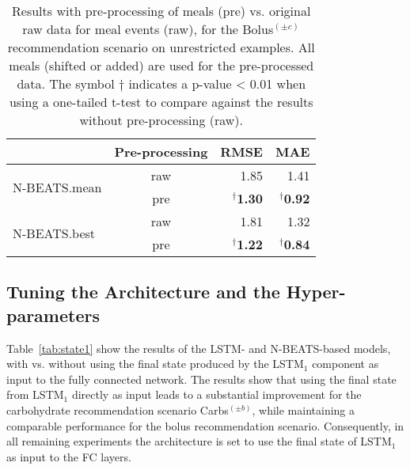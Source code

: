 \begin{table}[ht]
\setlength{\tabcolsep}{4pt}
\caption{Results with pre-processing of meals (pre) vs. original raw data for meal events (raw), for the Bolus$^{(\pm c)}$ recommendation scenario on unrestricted examples. All meals (shifted or added) are used for the pre-processed data. The symbol $\dagger$ indicates a p-value < 0.01 when using a one-tailed t-test to compare against the results without pre-processing (raw).}
\begin{center}
\label{tab:pre-bolus}
\small
\begin{tabular}{|l|c|rr|}
    \cline{2-4}
	\multicolumn{1}{c|}{} & Pre-processing & RMSE & MAE\\
    \hline
    \multirow{2}{*}{N-BEATS.mean} & raw & 1.85 & 1.41\\
    & pre & $^\dagger${\bf 1.30} & $^\dagger${\bf 0.92}\\
    \hline
    \multirow{2}{*}{N-BEATS.best} & raw & 1.81 & 1.32 \\
    & pre & $^\dagger${\bf 1.22} & $^\dagger${\bf 0.84}\\
    \hline
\end{tabular}
\end{center}
\end{table}

\subsection{Tuning the Architecture and the Hyper-parameters}
\label{sec:development}

Table~\ref{tab:state1} show the results of the \ac{LSTM}- and \ac{N-BEATS}-based models, with vs. without using the final state produced by the LSTM$_1$ component as input to the fully connected network. The results show that using the final state from LSTM$_1$ directly as input leads to a substantial improvement for the carbohydrate recommendation scenario Carbs$^{(\pm b)}$, while maintaining a comparable performance for the bolus recommendation scenario. Consequently, in all remaining experiments the architecture is set to use the final state of LSTM$_1$ as input to the \ac{FC} layers.

